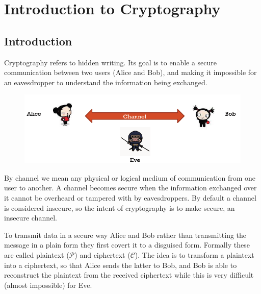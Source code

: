 \chapter{Introduction to Cryptography}

\section{Introduction}
Cryptography refers to hidden writing. Its goal is to enable a secure communication between two users (Alice and Bob), and making it impossible for an eavesdropper to understand the information being exchanged.

\begin{figure}
	\centering
	\includegraphics[width=0.7\linewidth]{Images/Chapter1/screenshot000}
	\caption{}
	\label{fig:chapter1_screenshot000}
\end{figure}

By channel we mean any physical or logical medium of communication from one user to another. A channel becomes secure when the information exchanged over it cannot be overheard or tampered with by eavesdroppers. By default a channel is considered insecure, so the intent of cryptography is to make secure, an insecure channel.

To transmit data in a secure way Alice and Bob rather than transmitting the message in a plain form they first covert it to a disguised form. Formally these are called plaintext ($\mathcal{P}$) and ciphertext ($\mathcal{C}$). The idea is to transform a plaintext into a ciphertext, so that Alice sends the latter to Bob, and Bob is able to reconstruct the plaintext from the received ciphertext while this is very difficult (almost impossible) for Eve.

